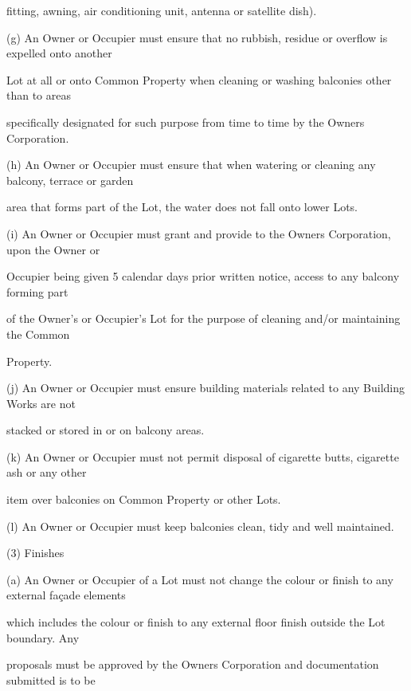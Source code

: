 \documentclass{article}
\begin{document}
{\fontsize{10.02}{1}fitting, awning, air conditioning unit, antenna or satellite dish). }

{\fontsize{9.962}{1}(g) An Owner or Occupier must ensure that no rubbish, residue or overflow is expelled onto another }

{\fontsize{10.02}{1}Lot at all or onto Common Property when cleaning or washing balconies other than to areas }

{\fontsize{10.02}{1}specifically designated for such purpose from time to time by the Owners Corporation. }

{\fontsize{9.962}{1}(h) An Owner or Occupier must ensure that when watering or cleaning any balcony, terrace or garden }

{\fontsize{10.02}{1}area that forms part of the Lot, the water does not fall onto lower Lots. }

{\fontsize{9.962}{1}(i) An Owner or Occupier must grant and provide to the Owners Corporation, upon the Owner or }

{\fontsize{10.02}{1}Occupier being given 5 calendar days prior written notice, access to any balcony forming part }

{\fontsize{10.02}{1}of the Owner's or Occupier's Lot for the purpose of cleaning and/or maintaining the Common }

{\fontsize{10.02}{1}Property. }

{\fontsize{9.962}{1}(j) An Owner or Occupier must ensure building materials related to any Building Works are not }

{\fontsize{10.02}{1}stacked or stored in or on balcony areas. }

{\fontsize{9.962}{1}(k) An Owner or Occupier must not permit disposal of cigarette butts, cigarette ash or any other }


{\fontsize{10.02}{1}item over balconies on Common Property or other Lots. }

{\fontsize{9.962}{1}(l) An Owner or Occupier must keep balconies clean, tidy and well maintained. }

{\fontsize{9.962}{1}(3) Finishes }

{\fontsize{9.962}{1}(a) An Owner or Occupier of a Lot must not change the colour or finish to any external façade elements }

{\fontsize{10.02}{1}which includes the colour or finish to any external floor finish outside the Lot boundary. Any }

{\fontsize{10.02}{1}proposals must be approved by the Owners Corporation and documentation submitted is to be }
\end{document}

